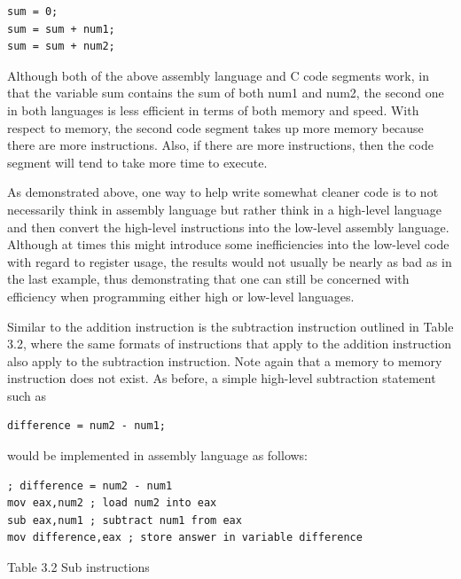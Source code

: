 \documentclass[10pt]{article}
\begin{document}
\begin{verbatim}
sum = 0;
sum = sum + num1;
sum = sum + num2;
\end{verbatim}

Although both of the above assembly language and C code segments work, in that the variable sum contains the sum of both num1 and num2, the second one in both languages is less efficient in terms of both memory and speed. With respect to memory, the second code segment takes up more memory because there are more instructions. Also, if there are more instructions, then the code segment will tend to take more time to execute.

As demonstrated above, one way to help write somewhat cleaner code is to not necessarily think in assembly language but rather think in a high-level language and then convert the high-level instructions into the low-level assembly language. Although at times this might introduce some inefficiencies into the low-level code with regard to register usage, the results would not usually be nearly as bad as in the last example, thus demonstrating that one can still be concerned with efficiency when programming either high or low-level languages.

Similar to the addition instruction is the subtraction instruction outlined in Table 3.2, where the same formats of instructions that apply to the addition instruction also apply to the subtraction instruction. Note again that a memory to memory instruction does not exist. As before, a simple high-level subtraction statement such as

\begin{verbatim}
difference = num2 - num1;
\end{verbatim}

would be implemented in assembly language as follows:

\begin{verbatim}
; difference = num2 - num1
mov eax,num2 ; load num2 into eax
sub eax,num1 ; subtract num1 from eax
mov difference,eax ; store answer in variable difference
\end{verbatim}

Table 3.2 Sub instructions
\end{document}
